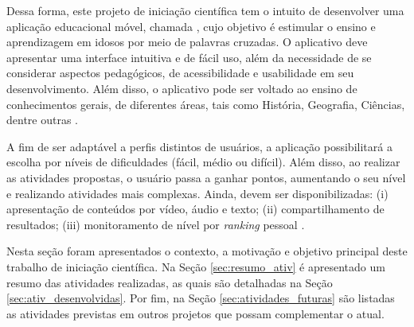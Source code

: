 
Dessa forma, este projeto de iniciação científica tem o intuito de desenvolver uma aplicação educacional móvel, chamada \crossword, cujo objetivo é estimular o ensino e aprendizagem em idosos por meio de palavras cruzadas. O aplicativo deve apresentar uma interface intuitiva e de fácil uso, além da necessidade de se considerar aspectos pedagógicos, de acessibilidade e usabilidade em seu desenvolvimento. Além disso, o aplicativo pode ser voltado ao ensino de conhecimentos gerais, de diferentes áreas, tais como História, Geografia, Ciências, dentre outras \citep{oliveira2018crossword}. 

A fim de ser adaptável a perfis distintos de usuários, a aplicação possibilitará a escolha por níveis de dificuldades (fácil, médio ou difícil). Além disso, ao realizar as atividades propostas, o usuário passa a ganhar pontos, aumentando o seu nível e realizando atividades mais complexas. Ainda, devem ser disponibilizadas: (i) apresentação de conteúdos por vídeo, áudio e texto; (ii) compartilhamento de resultados; (iii) monitoramento de nível por \textit{ranking} pessoal \citep{oliveira2018crossword}. 

Nesta seção foram apresentados o contexto, a motivação e objetivo principal deste trabalho de iniciação científica. Na Seção \ref{sec:resumo_ativ} é apresentado um resumo das atividades realizadas, as quais são detalhadas na Seção \ref{sec:ativ_desenvolvidas}. Por fim, na Seção \ref{sec:atividades_futuras} são listadas as atividades previstas em outros projetos que possam complementar o atual.
